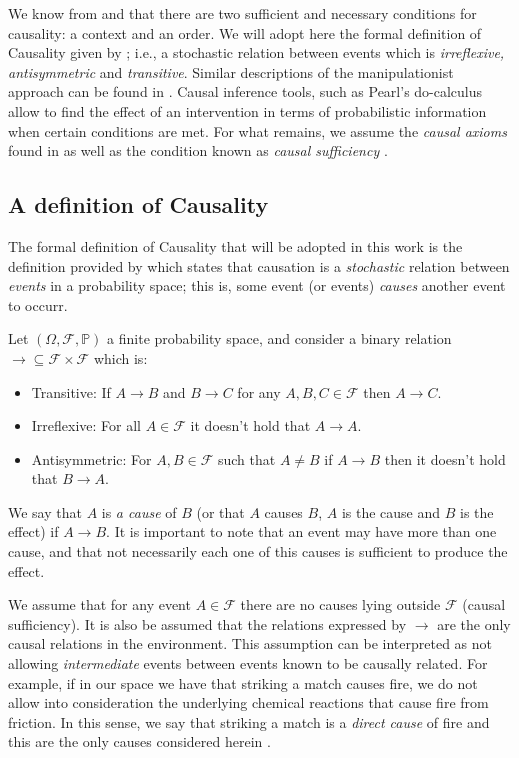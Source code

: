\documentclass{svjour3}                     %
\begin{document}
We know from \cite{granger1969investigating} and \cite{lamport1978time} that there are two sufficient and necessary conditions for causality: a context and an order. We will adopt here the formal definition of Causality given by \cite{spirtes2000causation}; i.e., a stochastic relation between events which is \textit{irreflexive, antisymmetric} and \textit{transitive}. Similar descriptions of the manipulationist approach can be found in \cite{holland1986statistics}. Causal inference tools, such as Pearl's do-calculus \citep{pearl2009causality} allow to find the effect of an intervention in terms of probabilistic information when certain conditions are met. For what remains, we assume the \textit{causal axioms} found in \citep{spirtes2000causation} as well as the condition known as \textit{causal sufficiency} \citep{pearl2009causality}.

\subsection{A definition of Causality}
The formal definition of Causality that will be adopted in this work is the definition provided by \cite{spirtes2000causation} which states that causation is a \textit{stochastic} relation between \textit{events} in a probability space; this is, some event (or events) \textit{causes} another event to occurr.
\begin{definition}{\label{causal_relation}}
Let $(\Omega, \mathcal{F}, \mathbb{P})$ a finite probability space, and consider a binary relation $\to \subseteq \mathcal{F} \times \mathcal{F}$ which is:
\begin{itemize}
\item Transitive: If $A \to B$ and $B \to C$ for any $A, B, C \in \mathcal{F}$ then $A \to C$.
\item Irreflexive: For all $A \in \mathcal{F}$ it doesn't hold that $A \to A$.
\item Antisymmetric: For $A,B \in \mathcal{F}$ such that $A \neq B$ if $A \to B$ then it doesn't hold that $B \to A$.
\end{itemize}
We say that $A$ is \textit{a cause} of $B$ (or that $A$ causes $B$, $A$ is the cause and $B$ is the effect) if $A \to B$. It is important to note that an event may have more than one cause, and that not necessarily each one of this causes is sufficient to produce the effect. 
\end{definition}

We assume that for any event $A \in \mathcal{F}$ there are no causes lying outside $\mathcal{F}$ (causal sufficiency). It is also be assumed that the relations expressed by $\to$ are the only causal relations in the environment. This assumption can be interpreted as not allowing \textit{intermediate} events between events known to be causally related. For example, if in our space we have that striking a match causes fire, we do not allow into consideration the underlying chemical reactions that cause fire from friction. In this sense, we say that striking a match is a \textit{direct cause} of fire and this are the only causes considered herein \citep{spirtes2000causation}. 
\end{document}
